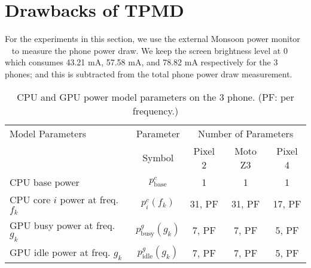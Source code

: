 \section{Drawbacks of TPMD}
\label{sec:primer}


For the experiments in this section,
we use the external Monsoon power monitor ~\cite{monsoonpowermonitor} to measure the phone power draw.
We keep the screen brightness level at 0 which consumes
43.21 mA, 57.58 mA, and 78.82 mA respectively for the 3 phones; and this is subtracted
from the total phone power draw measurement.

\begin{table}[t]
{\footnotesize
    \centering
    \caption{CPU and GPU power model parameters on the 3 phone. (PF: per frequency.)}
    \vspace{-0.1in}
    \begin{tabular}{|p{2.25cm}|c|c|c|c|}
        \hline
        Model Parameters & Parameter  & \multicolumn{3}{c|}{Number of Parameters}\\
         \cline{3-5}
          & Symbol & Pixel 2 & Moto Z3 & Pixel 4\\
        \hline
        CPU base power                          & $p^c_{\text{base}}$          &  1      &   1       & 1\\
        CPU core $i$ power at freq. $f_k$       & $p^c_i(f_k)$          & 31, PF  &  31, PF   & 17, PF\\
        GPU busy power at freq. $g_k$           & $p^g_{\text{busy}}(g_k)$     &  7, PF  &   7, PF   & 5, PF\\
        GPU idle power at freq. $g_k$           & $p^g_{\text{idle}}(g_k)$     &  7, PF  &   7, PF   & 5, PF\\
        \hline
    \end{tabular}
    \label{tab:parameters}
    \vspace{-0.2in}
}
\end{table}

